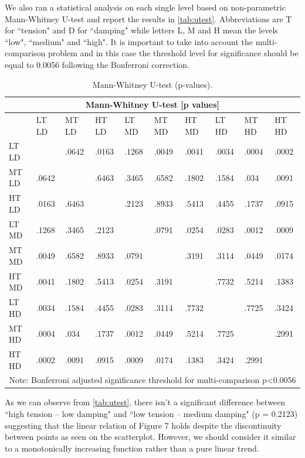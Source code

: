 \documentclass{article}
\begin{document}
We also ran a statistical analysis on each single level based on non-parametric Mann-Whitney U-test and report the results in \autoref{tab:utest}. Abbreviations are T for ``tension" and D for ``damping" while letters L, M and H mean the levels ``low", ``medium" and ``high". It is important to take into account the multi-comparison problem and in this case the threshold level for significance should be equal to 0.0056 following the Bonferroni correction.

\def \columnW {0.33cm}
\begin{table}[h!]
\tiny
\caption{Mann-Whitney U-test (p-values).}
\begin{tabular}{ |p{0.7cm}||p{\columnW}|p{\columnW}|p{\columnW}|p{\columnW}|p{\columnW}|p{\columnW}|p{\columnW}|p{\columnW}|p{\columnW}|  }
 \hline
 \multicolumn{10}{|c|}{Mann-Whitney U-test [p values]} \\
 \hline
  & LT LD & MT LD & HT LD & LT MD & MT MD & HT MD & LT HD & MT HD & HT HD \\
 \hline
LT LD &	 &.0642 &.0163 &.1268 &.0049 &.0041 &.0034 &.0004 &.0002\\
\hline
MT LD &.0642 &	 &.6463 &.3465 &.6582 &.1802 &.1584 &.034 &.0091\\
\hline
HT LD &.0163 &.6463 &	 &.2123 &.8933 &.5413 &.4455 &.1737 &.0915\\
\hline
LT MD &.1268 &.3465 &.2123 &	 &.0791 &.0254 &.0283 &.0012 &.0009\\
\hline
MT MD &.0049 &.6582 &.8933 &.0791 &	 &.3191 &.3114 &.0449 &.0174\\
\hline
HT MD &.0041 &.1802 &.5413 &.0254 &.3191 &	 &.7732 &.5214 &.1383\\
\hline
LT HD &.0034 &.1584 &.4455 &.0283 &.3114 &.7732 &	 &.7725 &.3424\\
\hline
MT HD &.0004 &.034 &.1737 &.0012 &.0449 &.5214 &.7725 &	 &.2991\\
\hline
HT HD &.0002 &.0091 &.0915 &.0009 &.0174 &.1383 &.3424 &.2991 &	\\

 \hline
 \multicolumn{10}{|c|}{Note: Bonferroni adjusted significance threshold for multi-comparison p\textless0.0056} \\
 \hline
\end{tabular}
\label{tab:utest}
\end{table}

As we can observe from \autoref{tab:utest}, there isn't a significant difference between ``high tension -- low damping" and ``low tension -- medium damping" (p = 0.2123) suggesting that the linear relation of Figure 7 holds despite the discontinuity between points as seen on the scatterplot. However, we should consider it similar to a monotonically increasing function rather than a pure linear trend. 
\end{document}
